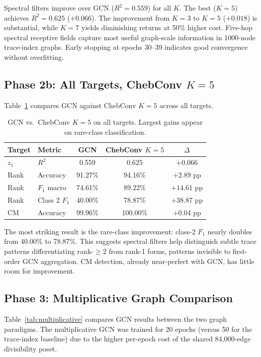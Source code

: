 \documentclass[11pt]{article}
\begin{document}
Spectral filters improve over GCN ($R^2 = 0.559$) for all $K$. The best ($K=5$) achieves $R^2 = 0.625$ ($+0.066$). The improvement from $K=3$ to $K=5$ ($+0.018$) is substantial, while $K=7$ yields diminishing returns at 50\% higher cost. Five-hop spectral receptive fields capture most useful graph-scale information in 1000-node trace-index graphs. Early stopping at epochs 30--39 indicates good convergence without overfitting.

\subsection{Phase 2b: All Targets, ChebConv $K=5$}

Table~\ref{tab:cheb-all} compares GCN against ChebConv $K=5$ across all targets.

\begin{table}[t]
\centering
\caption{GCN vs.\ ChebConv $K{=}5$ on all targets. Largest gains appear on rare-class classification.}
\label{tab:cheb-all}
\begin{tabular}{@{}llccc@{}}
\toprule
Target & Metric & GCN & ChebConv $K{=}5$ & $\Delta$ \\
\midrule
$z_1$ & $R^2$ & 0.559 & 0.625 & $+0.066$ \\
Rank & Accuracy & 91.27\% & 94.16\% & $+2.89$ pp \\
Rank & $F_1$ macro & 74.61\% & 89.22\% & $+14.61$ pp \\
Rank & Class 2 $F_1$ & 40.00\% & 78.87\% & $+38.87$ pp \\
CM & Accuracy & 99.96\% & 100.00\% & $+0.04$ pp \\
\bottomrule
\end{tabular}
\end{table}

The most striking result is the rare-class improvement: class-2 $F_1$ nearly doubles from 40.00\% to 78.87\%. This suggests spectral filters help distinguish subtle trace patterns differentiating rank-$\geq 2$ from rank-1 forms, patterns invisible to first-order GCN aggregation. CM detection, already near-perfect with GCN, has little room for improvement.

\subsection{Phase 3: Multiplicative Graph Comparison}

Table~\ref{tab:multiplicative} compares GCN results between the two graph paradigms. The multiplicative GCN was trained for 20 epochs (versus 50 for the trace-index baseline) due to the higher per-epoch cost of the shared 84,000-edge divisibility poset.
\end{document}
